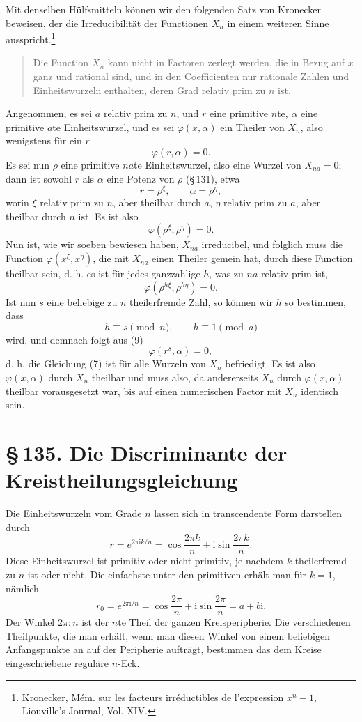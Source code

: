 \documentclass[11pt]{article}
\providecommand{\ii}{\mathrm{i}}
\providecommand{\sect}[2]{\section*{\S\,#1. #2}}
\begin{document}
Mit denselben Hülfsmitteln können wir den folgenden Satz von Kronecker beweisen, der die Irreducibilität der Functionen $X_n$ in einem weiteren Sinne ausspricht.\footnote{Kronecker, Mém. sur les facteurs irréductibles de l'expression $x^n-1$, Liouville's Journal, Vol. XIV.}
\begin{quote}
Die Function $X_n$ kann nicht in Factoren zerlegt werden, die in Bezug auf $x$ ganz und rational sind, und in den Coefficienten nur rationale Zahlen und Einheitswurzeln enthalten, deren Grad relativ prim zu $n$ ist.
\end{quote}
Angenommen, es sei $a$ relativ prim zu $n$, und $r$ eine primitive $n$te, $\alpha$ eine primitive $a$te Einheitswurzel, und es sei $\varphi(x,\alpha)$ ein Theiler von $X_n$, also wenigstens für ein $r$
\[
\tag{7}        \varphi(r,\alpha)=0.
\]
Es sei nun $\rho$ eine primitive $na$te Einheitswurzel, also eine Wurzel von $X_{na}=0$; dann ist sowohl $r$ als $\alpha$ eine Potenz von $\rho$ (\S\,131), etwa
\[
        r=\rho^\xi,\qquad \alpha=\rho^\eta,
\]
worin $\xi$ relativ prim zu $n$, aber theilbar durch $a$, $\eta$ relativ prim zu $a$, aber theilbar durch $n$ ist. Es ist also
\[
\tag{8}        \varphi(\rho^\xi,\rho^\eta)=0.
\]
Nun ist, wie wir soeben bewiesen haben, $X_{na}$ irreducibel, und folglich muss die Function $\varphi(x^\xi,x^\eta)$, die mit $X_{na}$ einen Theiler gemein hat, durch diese Function theilbar sein, d. h. es ist für jedes ganzzahlige $h$, was zu $na$ relativ prim ist,
\[
\tag{9}        \varphi(\rho^{h\xi},\rho^{h\eta})=0.
\]
Ist nun $s$ eine beliebige zu $n$ theilerfremde Zahl, so können wir $h$ so bestimmen, dass
\[
        h\equiv s\pmod n,\qquad h\equiv1\pmod a
\]
wird, und demnach folgt aus (9)
\[
        \varphi(r^s,\alpha)=0,
\]
d. h. die Gleichung (7) ist für alle Wurzeln von $X_n$ befriedigt. Es ist also $\varphi(x,\alpha)$ durch $X_n$ theilbar und muss also, da andererseits $X_n$ durch $\varphi(x,\alpha)$ theilbar vorausgesetzt war, bis auf einen numerischen Factor mit $X_n$ identisch sein.

\sect{135}{Die Discriminante der Kreistheilungsgleichung}

Die Einheitswurzeln vom Grade $n$ lassen sich in transcendente Form darstellen durch
\[
\tag{1}        r=e^{2\pi \ii k/n}=\cos\frac{2\pi k}{n}+\ii\sin\frac{2\pi k}{n}.
\]
Diese Einheitswurzel ist primitiv oder nicht primitiv, je nachdem $k$ theilerfremd zu $n$ ist oder nicht. Die einfachste unter den primitiven erhält man für $k=1$, nämlich
\[
\tag{2}        r_0=e^{2\pi \ii/n}=\cos\frac{2\pi}{n}+\ii\sin\frac{2\pi}{n}=a+b\ii.
\]
Der Winkel $2\pi:n$ ist der $n$te Theil der ganzen Kreisperipherie. Die verschiedenen Theilpunkte, die man erhält, wenn man diesen Winkel von einem beliebigen Anfangspunkte an auf der Peripherie aufträgt, bestimmen das dem Kreise eingeschriebene reguläre $n$-Eck.
\end{document}

